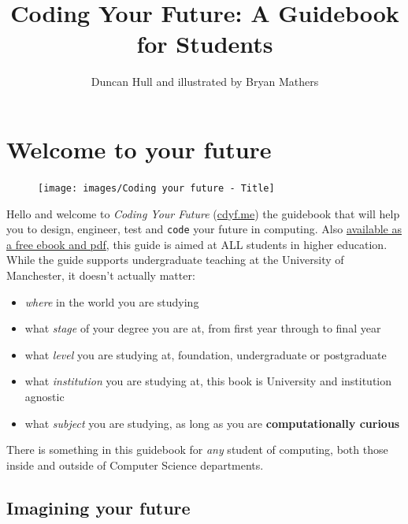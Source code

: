 \documentclass[
]{book}
\title{Coding Your Future: A Guidebook for Students}
\author{Duncan Hull and illustrated by Bryan Mathers}
\date{}
\providecommand{\tightlist}{%
  \setlength{\itemsep}{0pt}\setlength{\parskip}{0pt}}
\begin{document}
\maketitle

{
\setcounter{tocdepth}{1}
\tableofcontents
}
\hypertarget{welcome}{%
\chapter*{Welcome to your future}\label{welcome}}

\begin{figure}

{\centering \texttt{[image: images/Coding your future - Title]} 

}

\end{figure}

Hello and welcome to \emph{Coding Your Future} (\href{https://www.cdyf.me}{cdyf.me}) the guidebook that will help you to design, engineer, test and \texttt{code} your future in computing. Also \href{https://leanpub.com/cdyf}{available as a free ebook and pdf}, this guide is aimed at ALL students in higher education. While the guide supports undergraduate teaching at the University of Manchester, it doesn't actually matter:

\begin{itemize}
\tightlist
\item
  \emph{where} in the world you are studying
\item
  what \emph{stage} of your degree you are at, from first year through to final year
\item
  what \emph{level} you are studying at, foundation, undergraduate or postgraduate
\item
  what \emph{institution} you are studying at, this book is University and institution agnostic
\item
  what \emph{subject} you are studying, as long as you are \textbf{computationally curious}
\end{itemize}

There is something in this guidebook for \emph{any} student of computing, both those inside and outside of Computer Science departments. 👨🏿‍💻👨‍💻👩🏽‍💻👩‍💻👩🏿‍💻

\hypertarget{picturethis}{%
\section{Imagining your future}\label{picturethis}}
\end{document}
